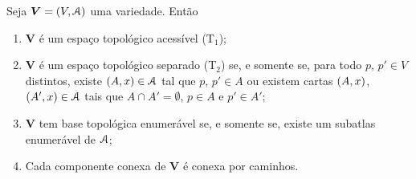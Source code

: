 \begin{proposition}
Seja $\bm V = (V,\mathcal{A})$ uma variedade. Então
	\begin{enumerate}
	\item $\bm V$ é um espaço topológico acessível (T$_1$);

	\item $\bm V$ é um espaço topológico separado (T$_2$) se, e somente se, para todo $p$, $p' \in V$ distintos, existe $(A,x) \in \mathcal{A}$ tal que $p$, $p' \in A$ ou existem cartas $(A,x)$, $(A',x) \in \mathcal{A}$ tais que $A \cap A' = \emptyset$, $p \in A$ e $p' \in A'$;

	\item $\bm V$ tem base topológica enumerável se, e somente se, existe um subatlas enumerável de $\mathcal{A}$;

	\item Cada componente conexa de $\bm V$ é conexa por caminhos.
	\end{enumerate}
\end{proposition}
